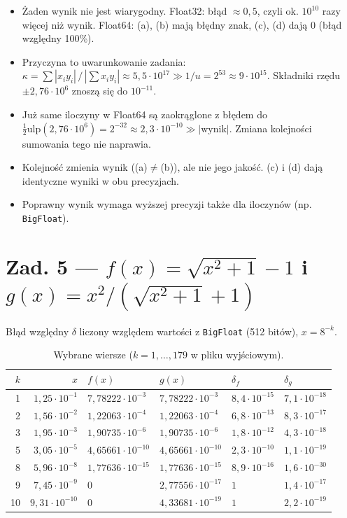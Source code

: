 \documentclass[10pt,a4paper]{article}
\begin{document}
\begin{itemize}
\item Żaden wynik nie jest wiarygodny. Float32: błąd $\approx0{,}5$, czyli ok. $10^{10}$ razy więcej niż wynik. Float64: (a), (b) mają błędny znak, (c), (d) dają $0$ (błąd względny 100\%).
\item Przyczyna to uwarunkowanie zadania: $\kappa=\sum|x_iy_i|\,/\,|\sum x_iy_i|\approx5{,}5\cdot10^{17}\gg 1/u=2^{53}\approx9\cdot10^{15}$. Składniki rzędu $\pm2{,}76\cdot10^{6}$ znoszą się do $10^{-11}$.
\item Już same iloczyny w Float64 są zaokrąglone z błędem do $\tfrac12\mathrm{ulp}(2{,}76\cdot10^6)=2^{-32}\approx2{,}3\cdot10^{-10}\gg|\text{wynik}|$. Zmiana kolejności sumowania tego nie naprawia.
\item Kolejność zmienia wynik ((a)$\neq$(b)), ale nie jego jakość. (c) i (d) dają identyczne wyniki w obu precyzjach.
\item Poprawny wynik wymaga wyższej precyzji także dla iloczynów (np. \texttt{BigFloat}).
\end{itemize}

\section*{Zad. 5 --- $f(x)=\sqrt{x^2+1}-1$ i $g(x)=x^2/(\sqrt{x^2+1}+1)$}

Błąd względny $\delta$ liczony względem wartości z \texttt{BigFloat} (512 bitów), $x=8^{-k}$.

\begin{table}[!htbp]
\centering\small
\setlength{\tabcolsep}{6pt}
\begin{tabular}{rrllll}
\toprule
$k$ & $x$ & $f(x)$ & $g(x)$ & $\delta_f$ & $\delta_g$\\
\midrule
1 & $1{,}25\cdot10^{-1}$ & $7{,}78222\cdot10^{-3}$ & $7{,}78222\cdot10^{-3}$ & $8{,}4\cdot10^{-15}$ & $7{,}1\cdot10^{-18}$\\
2 & $1{,}56\cdot10^{-2}$ & $1{,}22063\cdot10^{-4}$ & $1{,}22063\cdot10^{-4}$ & $6{,}8\cdot10^{-13}$ & $8{,}3\cdot10^{-17}$\\
3 & $1{,}95\cdot10^{-3}$ & $1{,}90735\cdot10^{-6}$ & $1{,}90735\cdot10^{-6}$ & $1{,}8\cdot10^{-12}$ & $4{,}3\cdot10^{-18}$\\
5 & $3{,}05\cdot10^{-5}$ & $4{,}65661\cdot10^{-10}$ & $4{,}65661\cdot10^{-10}$ & $2{,}3\cdot10^{-10}$ & $1{,}1\cdot10^{-19}$\\
8 & $5{,}96\cdot10^{-8}$ & $1{,}77636\cdot10^{-15}$ & $1{,}77636\cdot10^{-15}$ & $8{,}9\cdot10^{-16}$ & $1{,}6\cdot10^{-30}$\\
9 & $7{,}45\cdot10^{-9}$ & $0$ & $2{,}77556\cdot10^{-17}$ & $1$ & $1{,}4\cdot10^{-17}$\\
10 & $9{,}31\cdot10^{-10}$ & $0$ & $4{,}33681\cdot10^{-19}$ & $1$ & $2{,}2\cdot10^{-19}$\\
\bottomrule
\end{tabular}
\caption{Wybrane wiersze ($k=1,\dots,179$ w pliku wyjściowym).}
\end{table}
\end{document}
